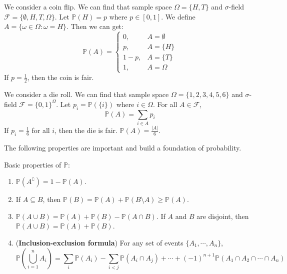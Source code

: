 \documentclass{huhtakm-template-book}
\newcommand{\prob}{\mathbb{P}}
\begin{document}
\newpage
\begin{eg}
	We consider a coin flip. We can find that sample space $\Omega=\{H,T\}$ and $\sigma$-field $\mathcal{F}=\{\emptyset,H,T,\Omega\}$. Let $\prob(H)=p$ where $p\in[0,1]$. We define $A=\{\omega\in\Omega:\omega = H\}$. Then we can get:
	\begin{equation*}
		\prob(A)=\begin{cases}
			0, &A=\emptyset\\
			p, &A=\{H\}\\
			1-p, &A=\{T\}\\
			1, &A=\Omega
		\end{cases}
	\end{equation*}
	If $p=\frac{1}{2}$, then the coin is fair.   
\end{eg}
\begin{eg}
	We consider a die roll. We can find that sample space $\Omega=\{1,2,3,4,5,6\}$ and $\sigma$-field $\mathcal{F}=\{0,1\}^{\Omega}$. Let $p_{i}=\prob(\{i\})$ where $i\in\Omega$. For all $A\in\mathcal{F}$,
	\begin{equation*}
		\prob(A)=\sum_{i\in A}p_{i}
	\end{equation*}
	If $p_{i}=\frac{1}{6}$ for all $i$, then the die is fair. $\prob(A)=\frac{|A|}{6}$.
\end{eg}
The following properties are important and build a foundation of probability.
\begin{lem}
	Basic properties of $\prob$:
	\begin{enumerate}
		\item $\prob(A^{\complement})=1-\prob(A)$.
		\item If $A\subseteq B$, then $\prob(B)=\prob(A)+\prob(B\setminus A)\geq\prob(A)$.
		\item $\prob(A\cup B)=\prob(A)+\prob(B)-\prob(A\cap B)$. If $A$ and $B$ are disjoint, then $\prob(A\cup B)=\prob(A)+\prob(B)$.
		\item (\textbf{Inclusion-exclusion formula}) For any set of events $\{A_{1},\cdots,A_{n}\}$,
		\begin{equation*}
			\prob\left(\bigcup_{i=1}^{n}A_{i}\right)=\sum_{i}\prob(A_{i})-\sum_{i<j}\prob(A_{i}\cap A_{j})+\cdots+(-1)^{n+1}\prob(A_{1}\cap A_{2}\cap\cdots\cap A_{n})
		\end{equation*}
	\end{enumerate}
\end{lem}
\end{document}

